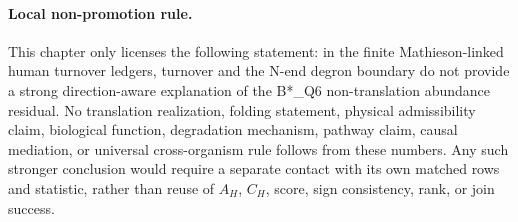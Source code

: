 \paragraph{Local non-promotion rule.}
This chapter only licenses the following statement: in the finite Mathieson-linked human turnover ledgers, turnover and the N-end degron boundary do not provide a strong direction-aware explanation of the B*\_Q6 non-translation abundance residual. No translation realization, folding statement, physical admissibility claim, biological function, degradation mechanism, pathway claim, causal mediation, or universal cross-organism rule follows from these numbers. Any such stronger conclusion would require a separate contact with its own matched rows and statistic, rather than reuse of $A_H$, $C_H$, score, sign consistency, rank, or join success.